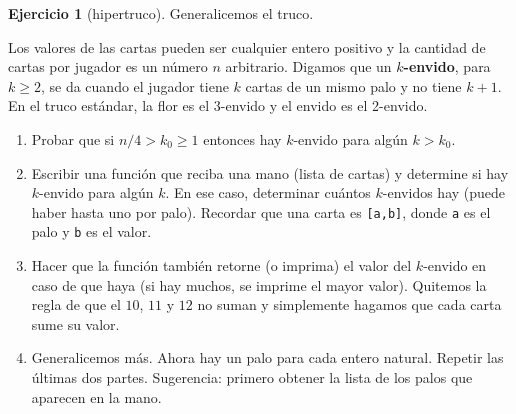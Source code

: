\documentclass[a4paper,12pt]{book}
\theoremstyle{definition}
\newtheorem{ejercicio}{Ejercicio}
\begin{document}
	\begin{ejercicio}[hipertruco]
		Generalicemos el truco.
		
		Los valores de las cartas pueden ser cualquier entero positivo y la cantidad de cartas por jugador es un número $n$ arbitrario. Digamos que un {\bf $k$-envido}, para $k\geq 2$, se da cuando el jugador tiene $k$ cartas de un mismo palo y no tiene $k+1$. En el truco estándar, la flor es el 3-envido y el envido es el 2-envido.
		
		\begin{enumerate}
			\item Probar que si $n/4>k_0\geq 1$ entonces hay $k$-envido para algún $k> k_0$.
			\item Escribir una función que reciba una mano (lista de cartas) y determine si hay $k$-envido para algún $k$. En ese caso, determinar cuántos $k$-envidos hay (puede haber hasta uno por palo). Recordar que una carta es {\tt [a,b]}, donde {\tt a} es el palo y {\tt b} es el valor.
			\item Hacer que la función también retorne (o imprima) el valor del $k$-envido en caso de que haya (si hay muchos, se imprime el mayor valor). Quitemos la regla de que el $10$, $11$ y $12$ no suman y simplemente hagamos que cada carta sume su valor.
			\item Generalicemos más. Ahora hay un palo para cada entero natural. Repetir las últimas dos partes. Sugerencia: primero obtener la lista de los palos que aparecen en la mano.
		\end{enumerate}
	\end{ejercicio}
	
\end{document}
